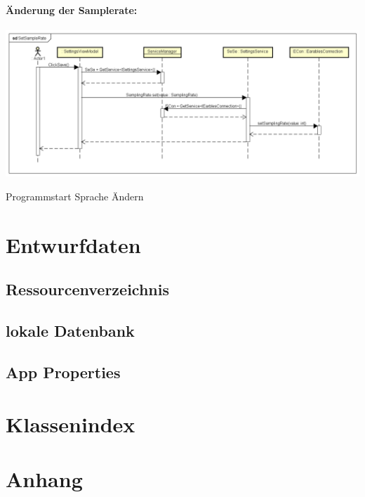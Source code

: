 \documentclass[a4paper,12pt]{article}
\begin{document}
\paragraph{Änderung der Samplerate:}
\includegraphics[width=1.1\textwidth]{./Diagramme/SetSampleRateSeqDia.png}

Programmstart
Sprache Ändern

\section{Entwurfdaten}
\subsection{Ressourcenverzeichnis}
\subsection{lokale Datenbank}
\subsection{App Properties}

\section{Klassenindex}
\section{Anhang}

\clearpage
\printglossaries
{}
\end{document}
